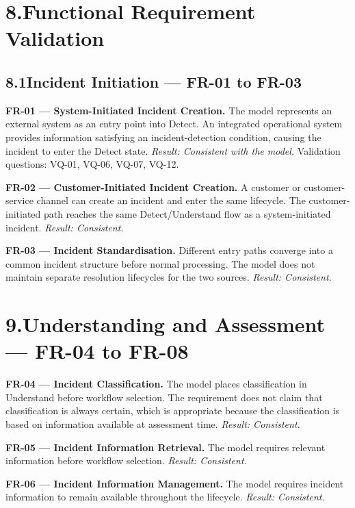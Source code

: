 \documentclass[11pt,a4paper]{article}
\begin{document}
\section*{8.\enspace Functional Requirement Validation}

\subsection*{8.1\enspace Incident Initiation — FR-01 to FR-03}

\textbf{FR-01 — System-Initiated Incident Creation.} The model represents an external system as an entry point into Detect. An integrated operational system provides information satisfying an incident-detection condition, causing the incident to enter the Detect state. \textit{Result: Consistent with the model.} Validation questions: VQ-01, VQ-06, VQ-07, VQ-12.

\textbf{FR-02 — Customer-Initiated Incident Creation.} A customer or customer-service channel can create an incident and enter the same lifecycle. The customer-initiated path reaches the same Detect/Understand flow as a system-initiated incident. \textit{Result: Consistent.}

\textbf{FR-03 — Incident Standardisation.} Different entry paths converge into a common incident structure before normal processing. The model does not maintain separate resolution lifecycles for the two sources. \textit{Result: Consistent.}

\section*{9.\enspace Understanding and Assessment — FR-04 to FR-08}

\textbf{FR-04 — Incident Classification.} The model places classification in Understand before workflow selection. The requirement does not claim that classification is always certain, which is appropriate because the classification is based on information available at assessment time. \textit{Result: Consistent.}

\textbf{FR-05 — Incident Information Retrieval.} The model requires relevant information before workflow selection. \textit{Result: Consistent.}

\textbf{FR-06 — Incident Information Management.} The model requires incident information to remain available throughout the lifecycle. \textit{Result: Consistent.}
\end{document}
